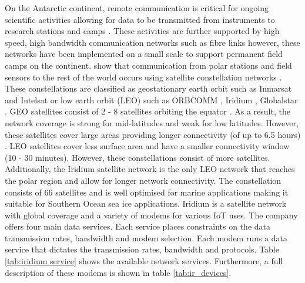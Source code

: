 On the Antarctic continent, remote communication is critical for ongoing scientific activities allowing for data to be transmitted from instruments to research stations and camps \cite{Sanghyun2016satellite}. These activities are further supported by high speed, high bandwidth communication networks such as fibre links \cite{jabbar2001multi} however, these networks have been implemented on a small scale to support permanent field camps \cite{Sanghyun2016satellite} on the continent. \textcite{Sanghyun2016satellite} show that communication from polar stations and field sensors to the rest of the world occurs using satellite constellation networks \cite{Sanghyun2016satellite}. These constellations are classified as  geostationary earth orbit such as Inmarsat \cite{inmarsat2021website} and Intelsat \cite{intelsat2021website} or low earth orbit (LEO) such as ORBCOMM \cite{orbcomm2021website}, Iridium \cite{iridium2019website}, Globalstar \cite{globalstar2021website} \cite{jabbar2001multi}. GEO satellites consist of 2 - 8 satellites orbiting the equator \cite{jabbar2001multi}. As a result, the network coverage is strong for mid-latitudes and weak for low latitudes. However, these satellites cover large areas providing longer connectivity (of up to 6.5 hours) \cite{Sanghyun2016satellite}. LEO satellites cover less surface area and have a smaller connectivity window (10 - 30 minutes). However, these constellations consist of more satellites. Additionally, the Iridium satellite network is the only LEO network that reaches the polar region \cite{jabbar2001multi} and allow for longer network connectivity. The constellation consists of 66 satellites \cite{Sanghyun2016satellite} and is well optimised for marine applications making it suitable for Southern Ocean sea ice applications. Iridium is a satellite network with global coverage and a variety of modems for various IoT uses. The company offers four main data services. Each service places constraints on the data transmission rates, bandwidth and modem selection. Each modem runs a data service that dictates the transmission rates, bandwidth and protocols.  Table \ref{tab:iridium service} shows the available network services. Furthermore, a full description of these modems is shown in table \ref{tab:ir_devices}. \par 

